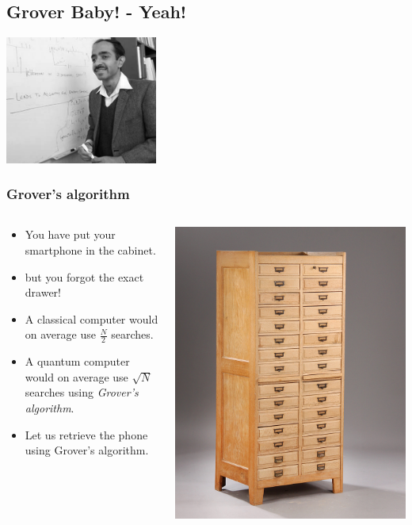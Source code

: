 \documentclass[10pt]{beamer}
\begin{document}
  \begin{frame}
    \section{\textbf{Grover} Baby! - Yeah!}
    \centering
\includegraphics[width=5cm]{./img/Lov-Kumar-Grover.jpg}
  \end{frame}
  \begin{frame}
    \frametitle{Grover's algorithm}
    \begin{columns}
      \begin{column}{0.6\linewidth}
        \begin{itemize}
        \item<+-> You have put your smartphone in the cabinet.
        \item<+-> but you forgot the exact drawer!
        \item<+-> A classical computer would on average use $\frac{N}{2}$ searches.
        \item<+-> A quantum computer would on average use $\sqrt{N}$ searches using \emph{Grover's algorithm}.
        \item<+-> Let us retrieve the phone using Grover's algorithm.
        \end{itemize}
      \end{column}
      \begin{column}{0.4\linewidth}
    \centering
\includegraphics[width=0.8\linewidth]{./img/arkivskab.jpg}
      \end{column}
    \end{columns}
  \end{frame}
\end{document}
